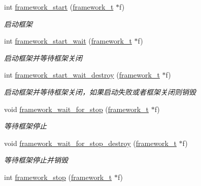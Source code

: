 \begin{DoxyCompactItemize}
int \hyperlink{a00103_ga23293faa7cc7d9f88ec73d4430a2355e_ga23293faa7cc7d9f88ec73d4430a2355e}{framework\+\_\+start} (\hyperlink{a00051_a6149d769f6f07ed14a40a271c95d8463_a6149d769f6f07ed14a40a271c95d8463}{framework\+\_\+t} $\ast$f)
\begin{DoxyCompactList}\small\item\em 启动框架 \end{DoxyCompactList}\item 
int \hyperlink{a00103_ga5fb7151fc13ce397884a7673b4fd319b_ga5fb7151fc13ce397884a7673b4fd319b}{framework\+\_\+start\+\_\+wait} (\hyperlink{a00051_a6149d769f6f07ed14a40a271c95d8463_a6149d769f6f07ed14a40a271c95d8463}{framework\+\_\+t} $\ast$f)
\begin{DoxyCompactList}\small\item\em 启动框架并等待框架关闭 \end{DoxyCompactList}\item 
int \hyperlink{a00103_ga4af709f98e2bd206da043cc29f915c99_ga4af709f98e2bd206da043cc29f915c99}{framework\+\_\+start\+\_\+wait\+\_\+destroy} (\hyperlink{a00051_a6149d769f6f07ed14a40a271c95d8463_a6149d769f6f07ed14a40a271c95d8463}{framework\+\_\+t} $\ast$f)
\begin{DoxyCompactList}\small\item\em 启动框架并等待框架关闭，如果启动失败或者框架关闭则销毁 \end{DoxyCompactList}\item 
void \hyperlink{a00103_gaefec7da1b548ddb97c73c8924ba17069_gaefec7da1b548ddb97c73c8924ba17069}{framework\+\_\+wait\+\_\+for\+\_\+stop} (\hyperlink{a00051_a6149d769f6f07ed14a40a271c95d8463_a6149d769f6f07ed14a40a271c95d8463}{framework\+\_\+t} $\ast$f)
\begin{DoxyCompactList}\small\item\em 等待框架停止 \end{DoxyCompactList}\item 
void \hyperlink{a00103_gada1de96de1586411c77b5357a7b2376a_gada1de96de1586411c77b5357a7b2376a}{framework\+\_\+wait\+\_\+for\+\_\+stop\+\_\+destroy} (\hyperlink{a00051_a6149d769f6f07ed14a40a271c95d8463_a6149d769f6f07ed14a40a271c95d8463}{framework\+\_\+t} $\ast$f)
\begin{DoxyCompactList}\small\item\em 等待框架停止并销毁 \end{DoxyCompactList}\item 
int \hyperlink{a00103_ga429be76d09278d6170f1b519f4dbb689_ga429be76d09278d6170f1b519f4dbb689}{framework\+\_\+stop} (\hyperlink{a00051_a6149d769f6f07ed14a40a271c95d8463_a6149d769f6f07ed14a40a271c95d8463}{framework\+\_\+t} $\ast$f)

\end{DoxyCompactItemize}
